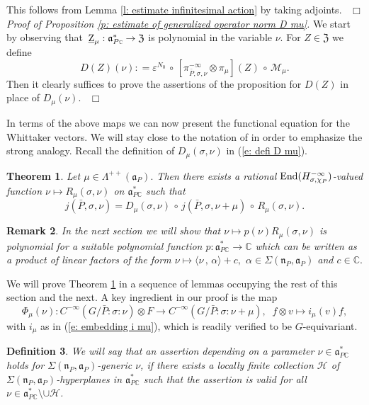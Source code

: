\documentclass[12pt,a4paper]{article}
\newtheorem{Thm}{Theorem}
\newtheorem{Defi}[Thm]{Definition}
\newtheorem{Rem}[Thm]{Remark}
\newenvironment{thm}[0]{\begin{Thm}\noindent}%
{\end{Thm}}
\newenvironment{defi}[0]{\begin{Defi}\noindent\rm}%
{\end{Defi}}
\newenvironment{rem}[0]{\begin{Rem}\noindent\rm}%
{\end{Rem}}
\def\proof{\par\noindent{\it Proof.}{\ }{\ }}
\def\qed{~\hfill\hbox{$\Box$}\medbreak}
\def\medno{\medbreak\noindent}
\def\msy#1{{\mathbb #1}}
\def\C{{\msy C}}
\def\ga{\alpha}
\def\ge{\varepsilon}
\def\gs{\sigma}
\def\gS{\Sigma}
\def\got#1{\mathfrak #1}
\def\fa{{\got a}}
\def\fn{{\got n}}
\def\to{\rightarrow}
\def\inp#1#2{\langle#1\,,\,#2\rangle}
\def\End{{\rm End}}
\def\after{\,{\scriptstyle\circ}\,}
\def\iC{{\scriptscriptstyle \C}}
\def\cH{{\mathcal H}}
\def\cM{{\mathcal M}}
\numberwithin{Thm}{section}
\numberwithin{equation}{section}
\def\fZ{{\mathfrak Z}}
\def\faPdc{{\fa_{P\iC}^*}}
\def\gL{\Lambda}
\numberwithin{equation}{section}
\def\fZ{{\mathfrak Z}}
\def\gL{\Lambda}
\def\faPdc{\fa_{P\iC}^*}
\def\faP{\fa_P}
\def\ulrmZ{\,\underline{\rm Z}_\mu}
\def\cchi{\chi}
\def\bfhyp{hyperplanes}
\begin{document}
\proof 
This follows from Lemma \ref{l: estimate infinitesimal action} by taking adjoints.
\qed
\medno
{\em Proof of Proposition \ref{p: estimate of generalized operator norm D mu}. }
We start by observing that $\ulrmZ: \faPdc \to \fZ$ is polynomial in the variable 
$\nu.$ For $Z \in \fZ$ we define 
$$ 
D(Z)(\nu): = \ge^{N _0}\after [\pi^{-\infty}_{\bar P,\gs, \nu} \otimes \pi_\mu](Z) \after \cM_\mu.
$$ 
Then it clearly suffices to prove the assertions of the proposition for $D(Z)$ in place of $D_\mu(\nu).$ 
\qed

In terms of the above maps we can now present the functional 
equation for the Whittaker vectors. We will stay close to the 
notation of \cite[Thm. 9.3]{Bps2} in order to emphasize the strong 
analogy. Recall the definition of $D_\mu(\gs, \nu)$ in (\ref{e: defi D mu}).

\begin{thm}{\rm (Functional equation)\;}
\label{t: the functional equation}
Let $\mu \in \gL^{++}(\fa_P).$ Then there exists
a rational $\End(H_{\gs,\cchi_P}^{-\infty})$-valued function 
$\nu \mapsto R_\mu(\gs,\nu)$ on $\faPdc$ such that 
\begin{equation}
\label{e: functional equation}
j(\bar P,\gs , \nu ) = D_\mu(\gs, \nu) \after j(\bar P,\gs, \nu + \mu) \after R_\mu(\gs, \nu).
\end{equation}
\end{thm}

\begin{rem} In the next section we will show that $\nu \mapsto p(\nu) R_\mu(\gs, \nu)$ 
is polynomial for a suitable polynomial function $p: \faPdc \to \C$ 
which can be written as a product of linear factors of the form $\nu \mapsto \inp{\nu}{\ga} + c,$ 
$\ga \in \gS(\fn_P, \faP)$ and $c \in \C.$ 
\end{rem}

We will prove Theorem \ref{t: the functional equation} in a sequence of lemmas occupying the rest of this section
and the next. A key ingredient in our proof is the map 
$$ 
\Phi_\mu(\nu): C^{-\infty}(G/\bar P: \gs: \nu)\otimes F \to C^{-\infty}(G/\bar P: \gs: \nu+\mu), \;\;f\otimes v \mapsto i_\mu(v) f,
$$ 
with $i_\mu$ as in (\ref{e: embedding i mu}),
which is readily verified to be $G$-equivariant.

\begin{defi}
We will say that an assertion depending on a parameter $\nu \in \faPdc$ holds for 
$\gS(\fn_P,\fa_P)$-generic $\nu$, if there exists a locally finite collection
$\cH$ of $\gS(\fn_P, \faP)$-{\bfhyp} in $\faPdc$ such that the assertion is valid
for all $\nu \in \faPdc\setminus\cup \cH$. 
\end{defi}
\end{document}
